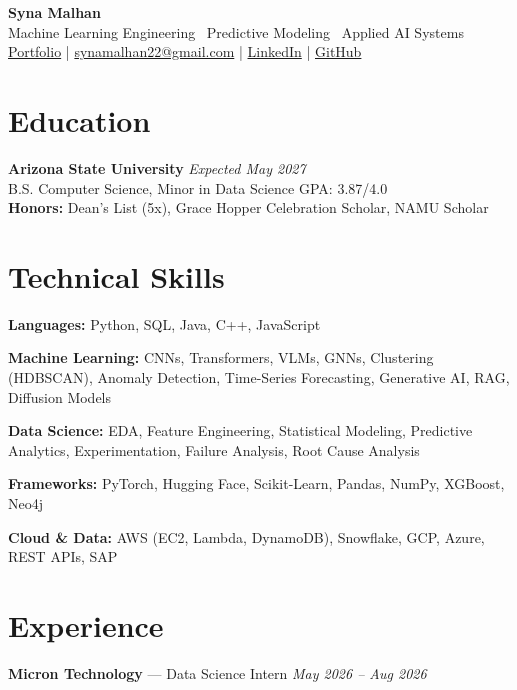 \documentclass[a4paper,8pt]{extarticle}
\begin{document}
\begin{center}
{\Large \textbf{Syna Malhan}}\\
Machine Learning Engineering \textbullet\  Predictive Modeling \textbullet\  Applied AI Systems\\
\href{https://synamalhan.github.io/website/}{Portfolio}
\;|\;
\href{mailto:synamalhan22@gmail.com}{synamalhan22@gmail.com}
\;|\;
\href{https://www.linkedin.com/in/synamalhan/}{LinkedIn}
\;|\;
\href{https://github.com/synamalhan}{GitHub}
\end{center}

\section*{Education}

\noindent
\textbf{Arizona State University} \hfill \textit{Expected May 2027}\\
\noindent
B.S. Computer Science, Minor in Data Science \hfill GPA: 3.87/4.0\\
\noindent
\textbf{Honors:} Dean's List (5x), Grace Hopper Celebration Scholar, NAMU Scholar

\section*{Technical Skills}

\noindent
\textbf{Languages:} Python, SQL, Java, C++, JavaScript

\noindent
\textbf{Machine Learning:} CNNs, Transformers, VLMs, GNNs, Clustering (HDBSCAN), Anomaly Detection, Time-Series Forecasting, Generative AI, RAG, Diffusion Models

\noindent
\textbf{Data Science:} EDA, Feature Engineering, Statistical Modeling, Predictive Analytics, Experimentation, Failure Analysis, Root Cause Analysis

\noindent
\textbf{Frameworks:} PyTorch, Hugging Face, Scikit-Learn, Pandas, NumPy, XGBoost, Neo4j

\noindent
\textbf{Cloud \& Data:} AWS (EC2, Lambda, DynamoDB), Snowflake, GCP, Azure, REST APIs, SAP

\section*{Experience}

\noindent
\textbf{Micron Technology} --- Data Science Intern
\hfill \textit{May 2026 -- Aug 2026}
\end{document}
